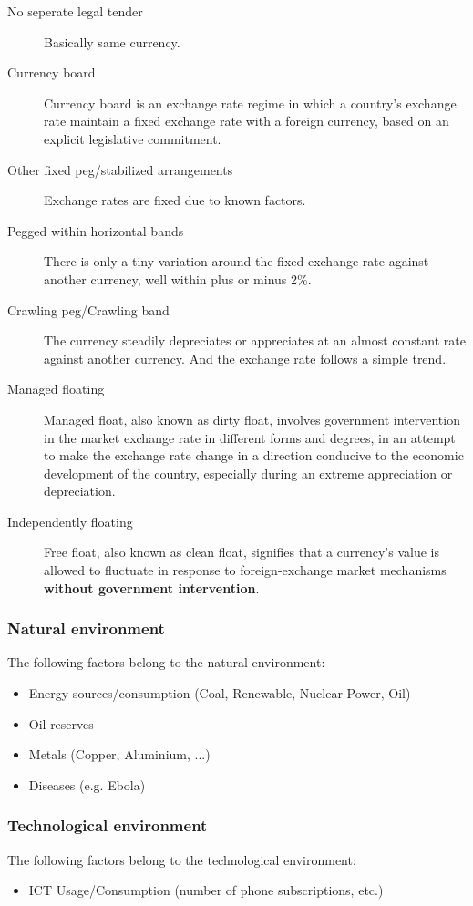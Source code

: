 \begin{description}
	\item[No seperate legal tender] Basically same currency.
	\item[Currency board] Currency board is an exchange rate regime in which a country's exchange rate maintain a fixed exchange rate with a foreign currency, based on an explicit legislative commitment.
	\item[Other fixed peg/stabilized arrangements] Exchange rates are fixed due to known factors.
	\item[Pegged within horizontal bands] There is only a tiny variation around the fixed exchange rate against another currency, well within plus or minus 2\%.
	\item[Crawling peg/Crawling band] The currency steadily depreciates or appreciates at an almost constant rate against another currency. And the exchange rate follows a simple trend.
	\item[Managed floating] Managed float, also known as dirty float, involves government intervention in the market exchange rate in different forms and degrees, in an attempt to make the exchange rate change in a direction conducive to the economic development of the country, especially during an extreme appreciation or depreciation.
	\item[Independently floating] Free float, also known as clean float, signifies that a currency's value is allowed to fluctuate in response to foreign-exchange market mechanisms \textbf{without government intervention}. 
\end{description}


\subsubsection{Natural environment}
The following factors belong to the natural environment:
\begin{itemize}
	\tightlist
	\item Energy sources/consumption (Coal, Renewable, Nuclear Power, Oil)
	\item Oil reserves
	\item Metals (Copper, Aluminium, ...)
	\item Diseases (e.g. Ebola)
\end{itemize}

\subsubsection{Technological environment}
The following factors belong to the technological environment:
\begin{itemize}
	\item ICT Usage/Consumption (number of phone subscriptions, etc.)
\end{itemize}

